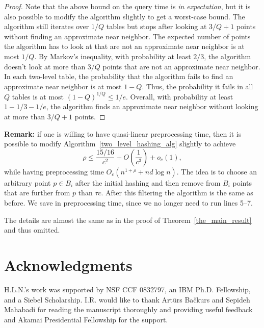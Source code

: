 \documentclass[11pt,letterpaper]{article}
\begin{document}
\begin{proof}
    Note that the above bound on the query time is \emph{in expectation}, but it is also possible to modify the algorithm slightly to get a worst-case bound. The algorithm still iterates over $1/Q$ tables but stops after looking at $3/Q+1$ points without finding an approximate near neighbor. The expected number of points the algorithm has to look at that are not an approximate near neighbor is at most $1/Q$. By Markov's inequality, with probability at least $2/3$, the algorithm doesn't look at more than $3/Q$ points that are not an approximate near neighbor. In each two-level table, the probability that the algorithm fails to find an approximate near neighbor is at most $1-Q$. Thus, the probability it fails in all $Q$ tables is at most $(1-Q)^{1/Q} \le 1/e$. Overall, with probability at least $1-1/3-1/e$, the algorithm finds an approximate near neighbor without looking at more than $3/Q+1$ points. 
\end{proof}

\textbf{Remark:} if one is willing to have quasi-linear preprocessing time, then it is possible to modify 
Algorithm~\ref{two_level_hashing_alg} slightly to achieve
$$
    \rho \leq \frac{15/16}{c^2} + O\left(\frac{1}{c^3}\right) + o_c(1),
$$
while having preprocessing time $O_c(n^{1 + \rho} + nd \log n)$.
The idea is to choose an arbitrary point $p \in B_i$ after the initial hashing and then remove from $B_i$ points
that are further from $p$ than $\tau c$.
After this filtering the algorithm is the same as before.
We save in preprocessing time, since we no longer need to run lines 5--7.

The details are almost the same as in the proof of Theorem~\ref{the_main_result} and thus omitted.



\section{Acknowledgments}
H.L.N.'s work was supported by NSF CCF 0832797, an IBM Ph.D. Fellowship, and a Siebel Scholarship.
I.R. would like to thank Art\={u}rs Ba\v{c}kurs and Sepideh Mahabadi for reading the manuscript thoroughly and providing useful feedback and Akamai Presidential Fellowship for the support.
\end{document}
